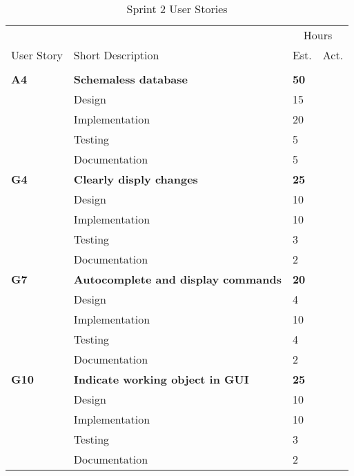 \begin{table}
\caption{Sprint 2 User Stories}
\centering
\begin{tabular}{ l p{8cm} l l }
\hline 
            &               &\multicolumn{2}{c}{Hours}          \\
 User Story & Short Description     &Est.       &Act.                                  \\ 
\hline \\ [-2.0ex]
 \bf{A4}     &\bf{Schemaless database}        &\bf{50}        &          \\ 
          &Design                           &15          &      \\
          &Implementation                   &20         &     \\
          &Testing                          &5          &      \\
          &Documentation                    &5          &      \\

 \bf{G4}     &\bf{Clearly disply changes}         &\bf{25}        &               \\ 
          &Design                           &10          &      \\
          &Implementation                   &10         &      \\
          &Testing                          &3          &      \\
          &Documentation                    &2          &      \\

 \bf{G7}     &\bf{Autocomplete and display commands}     &\bf{20}        &             \\ 
          &Design                           &4          &      \\
          &Implementation                   &10          &     \\
          &Testing                          &4          &      \\
          &Documentation                    &2            &      \\

 \bf{G10}     &\bf{Indicate working object in GUI}       &\bf{25}        &            \\ 
          &Design                           &10         &     \\
          &Implementation                   &10         &     \\
          &Testing                          &3          &      \\
          &Documentation                    &2          &      \\


\end{tabular}
\end{table}
